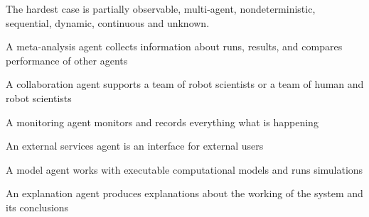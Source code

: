 The hardest case is partially observable, multi-agent, nondeterministic, sequential, dynamic, continuous and unknown.













A meta-analysis agent collects information about runs, results, and compares performance of other agents

A collaboration agent supports a team of robot scientists or a team of human and robot scientists

A monitoring agent monitors and records everything what is happening 

An external services agent is an interface for external users

A model agent works with executable computational models and runs simulations

An explanation agent produces explanations about the working of the system and its conclusions




